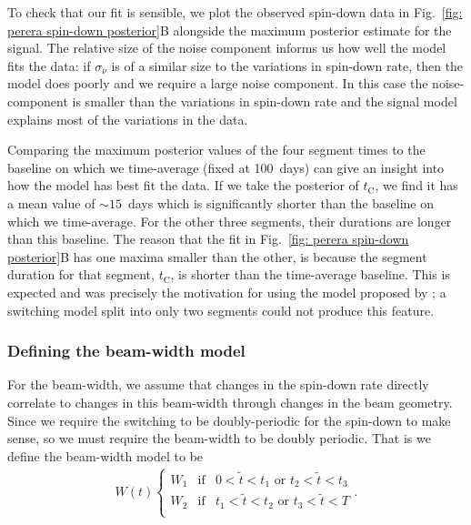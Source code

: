 \documentclass[../full_thesis/full_thesis.tex]{subfiles}
\newcommand{\Wone}{W_{1}}
\newcommand{\Wtwo}{W_{2}}
\newcommand{\tI}[1]{t_{\mathrm{#1}}}
\begin{document}
To check that our fit is sensible, we plot the observed spin-down data in
Fig.~\ref{fig: perera spin-down posterior}B alongside the maximum posterior
estimate for the signal. The relative size of the noise component informs us
how well the model fits the data: if $\sigma_{\dot{\nu}}$ is of a similar size
to the variations in spin-down rate, then the model does poorly and we require
a large noise component. In this case the noise-component is smaller than the
variations in spin-down rate and the signal model explains most of the
variations in the data.

Comparing the maximum posterior values of the four segment times to the
baseline on which we time-average (fixed at 100~days) can give an insight into how the
model has best fit the data. If we take the posterior of $\tI{C}$, we find it
has a mean value of $\sim 15$~days which is significantly shorter than the
baseline on which we time-average. For the other three segments, their durations are
longer than this baseline. The reason that the fit in Fig.~\ref{fig: perera
spin-down posterior}B has one maxima smaller than the other, is because the
segment duration for that segment, $\tI{C}$, is shorter than the time-average
baseline. This is expected and was precisely the motivation for using the model
proposed by \citet{Perera2015}; a switching model split into only two segments
could not produce this feature.

\subsubsection{Defining the beam-width model}

For the beam-width, we assume that changes in the spin-down rate directly
correlate to changes in this beam-width through changes in the beam geometry.
Since we require the switching to be doubly-periodic for the spin-down to make
sense, so we must require the beam-width to be doubly periodic. That is we
define the beam-width model to be
\begin{align}
W(t) \left\{
    \begin{array}{ccc}
    \Wone & \mathrm{if} & 0 < \tilde{t} < t_{1}
    \textrm{ or } t_{2} < \tilde{t} < t_{3}\\
    \Wtwo & \mathrm{if} & t_{1} < \tilde{t} < t_{2}
    \textrm{ or } t_{3} < \tilde{t} < T\\
    \end{array}
    \right..
\label{eqn: switching beam-width model}
\end{align}
\end{document}
